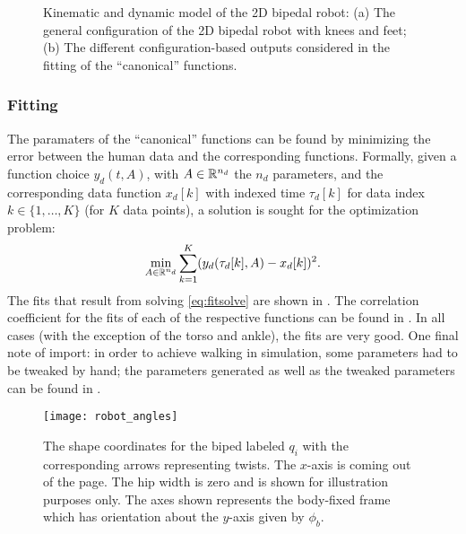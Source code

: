 \begin{figure}[t!]
  \centering
  \hspace{.2cm}
  \caption[Kinematic and dynamic model of the 2D bipedal robot.]{Kinematic and
    dynamic model of the 2D bipedal robot:
    (a) The general configuration of the 2D bipedal robot with knees and feet;
    (b) The different configuration-based outputs considered in the fitting of
    the ``canonical'' functions.}
    \label{fig:robotconstraints}
\end{figure}

\subsubsection{Fitting}
The paramaters of the ``canonical'' functions can be found by minimizing the
error between the human data and the corresponding functions. Formally, given a
function choice $y_d(t, A)$, with $A \in \mathbb{R}^{n_{d}}$ the $n_d$ parameters, and
the corresponding data function $x_{d}[k]$ with indexed time $\tau_{d}[k]$ for
data index $k \in \{1, \ldots, K\}$ (for $K$ data points),  a solution is sought
for the optimization problem:
\begin{align}
  \label{eq:fitsolve}
  \min_{A \in \mathbb{R}^{n_{d}}} \sum_{k=1}^{K} (y_{d}(\tau_{d}[k], A) - x_{d}[k])^2.
\end{align}
The fits that result from solving \eqref{eq:fitsolve} are shown in . The correlation coefficient for the fits of each of the respective functions can be found in . In all cases (with the exception of the torso and ankle), the fits are very good. One final note of import: in order to achieve walking in simulation, some parameters had to be tweaked by hand; the parameters generated as well as the tweaked parameters can be found in .

\begin{figure}
  \centering
  \texttt{[image: robot\_angles]}
  \caption[The shape coordinates for the biped labeled $q_i$]{The shape coordinates for the biped labeled $q_i$ with the corresponding arrows representing twists. The $x$-axis is coming out of the page. The hip width is zero and is shown for illustration purposes only. The axes shown represents the body-fixed frame which has orientation about the $y$-axis given by $\phi_b$.}
  \label{fig:shapecoords}
\end{figure}

